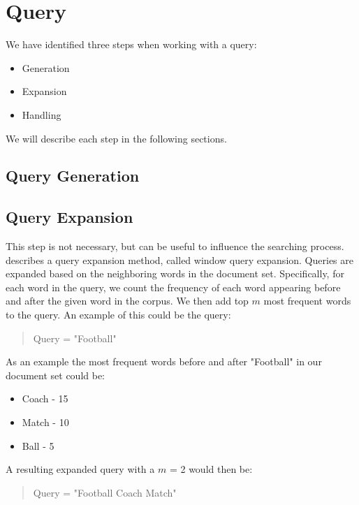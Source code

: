 \section{Query}
We have identified three steps when working with a query:
\begin{itemize}
	\item Generation
	\item Expansion
	\item Handling
\end{itemize}

We will describe each step in the following sections.

\subsection{Query Generation}


\subsection{Query Expansion}
This step is not necessary, but can be useful to influence the searching process. 
\citet{yang2009topic} describes a query expansion method, called window query expansion.
Queries are expanded based on the neighboring words in the document set.
Specifically, for each word in the query, we count the frequency of each word appearing before and after the given word in the corpus.
We then add top $m$ most frequent words to the query.
An example of this could be the query: 
\begin{quote}
	Query = "Football"
\end{quote}
As an example the most frequent words before and after "Football" in our document set could be:
\begin{itemize}
	\item Coach - 15
	\item Match - 10
	\item Ball - 5
\end{itemize}
A resulting expanded query with a $m$ = 2 would then be:
\begin{quote}
	Query = "Football Coach Match"
\end{quote}



